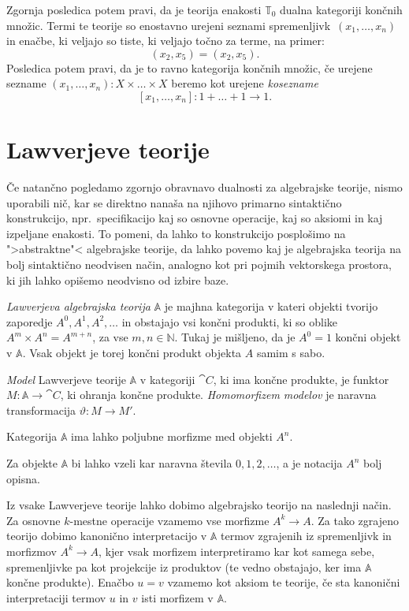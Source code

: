 \documentclass[../kategoricna_logika.tex]{subfiles}
\begin{document}
Zgornja posledica potem pravi, da je teorija enakosti \(\mathbb{T}_0\) dualna
kategoriji končnih množic. Termi te teorije so enostavno urejeni seznami
spremenljivk~\((x_1, \ldots, x_n)\) in enačbe, ki veljajo so tiste,
ki veljajo točno za terme, na primer:
\[(x_2, x_5) = (x_2, x_5).\]
Posledica potem pravi, da je to ravno kategorija končnih množic, če
urejene sezname \((x_1, \ldots, x_n) : X \times \ldots \times X\) beremo
kot urejene \emph{kosezname} \[[x_1, \ldots, x_n] : 1 + \ldots + 1 \to 1.\]
%
%
\section{Lawverjeve teorije}
\label{sec:org3518651}
Če natančno pogledamo zgornjo obravnavo dualnosti za algebrajske teorije, nismo uporabili nič,
kar se direktno nanaša na njihovo primarno sintaktično konstrukcijo, npr.\ specifikacijo
kaj so osnovne operacije, kaj so aksiomi in kaj izpeljane enakosti.
To pomeni, da lahko to konstrukcijo posplošimo na ">abstraktne"< algebrajske teorije,
da lahko povemo kaj je algebrajska teorija na bolj sintaktično neodvisen način,
analogno kot pri pojmih vektorskega prostora, ki jih lahko
opišemo neodvisno od izbire baze.
\begin{definicija}
\emph{Lawverjeva algebrajska teorija} \(\mathbb{A}\) je majhna kategorija
v kateri objekti tvorijo zaporedje \(A^0, A^1, A^2, \ldots\) in obstajajo
vsi končni produkti, ki so oblike \(A^m \times A^n = A^{m + n}\), za vse \(m,n \in \mathbb{N}\).
Tukaj je mišljeno, da je \(A^0 = 1\) končni objekt v \(\mathbb{A}\).
Vsak objekt je torej končni produkt objekta \(A\) samim s sabo.

\emph{Model} Lawverjeve teorije \(\mathbb{A}\) v kategoriji \(\cat{C}\),
ki ima končne produkte, je funktor \(M : \mathbb{A} \to \cat{C}\),
ki ohranja končne produkte. \emph{Homomorfizem modelov} je naravna
transformacija \(\vartheta : M \to M'\).
\end{definicija}
%
\begin{opomba}
Kategorija \(\mathbb{A}\) ima lahko poljubne morfizme med objekti \(A^n\).
\end{opomba}
\begin{opomba}
Za objekte \(\mathbb{A}\) bi lahko vzeli kar naravna števila \(0, 1, 2, \ldots\),
a je notacija \(A^n\) bolj opisna.
\end{opomba}
%
Iz vsake Lawverjeve teorije lahko dobimo algebrajsko teorijo na naslednji način.
Za osnovne \(k\)-mestne operacije vzamemo vse morfizme \(A^k \to A\). 
Za tako zgrajeno teorijo dobimo kanonično interpretacijo v \(\mathbb{A}\) termov
zgrajenih iz spremenljivk in morfizmov \(A^k \to A\), kjer vsak morfizem interpretiramo
kar kot samega sebe, spremenljivke pa kot projekcije iz produktov (te vedno obstajajo,
ker ima \(\mathbb{A}\) končne produkte). Enačbo \(u = v\) vzamemo kot aksiom te teorije,
če sta kanonični interpretaciji termov \(u\) in \(v\) isti morfizem v \(\mathbb{A}\).
\end{document}
